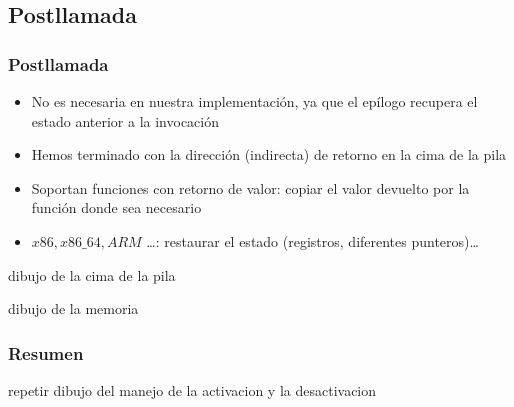 \documentclass[hyperref={pdfpagelabels=false},tree-dvips]{beamer}
\begin{document}
\subsection{Postllamada}
\begin{frame}[fragile]
\frametitle{Postllamada}

\begin{itemize}[<+->]
    \item No es necesaria en nuestra implementación, ya que el epílogo recupera el estado anterior a la invocación
    \item Hemos terminado con la dirección (indirecta) de retorno en la cima de la pila
\end{itemize}
\begin{itemize}[<+->]
    \item Soportan funciones con retorno de valor: copiar el valor devuelto por la función donde sea necesario
    \item $x86,x86\_64,ARM$ \ldots: restaurar el estado (registros, diferentes punteros)\ldots
\end{itemize}

dibujo de la cima de la pila

dibujo de la memoria

\end{frame}
\begin{frame}[fragile]
\frametitle{Resumen}

repetir dibujo del manejo de la activacion y la desactivacion

\end{frame}
\end{document}
